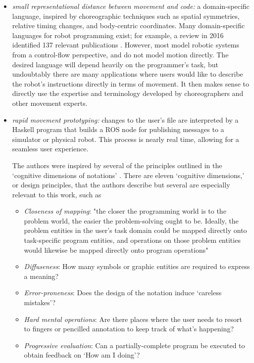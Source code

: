 \documentclass[sigchi-a]{acmart}
\begin{document}
\begin{itemize}
\item \emph{small representational distance between
movement and code:} a domain-specific language, inspired by choreographic
techniques such as spatial symmetries, relative timing changes, and body-centric
coordinates. Many domain-specific languages for robot programming exist; for example, a
review in 2016 identified 137 relevant publications 
\cite{nordmann2016survey}. However, most model robotic
systems from a control-flow perspective, and do not model motion directly. The
desired language will depend heavily on the programmer's task, but undoubtably
there are many applications where users would like to describe the robot's
instructions directly in terms of movement. It then makes sense to directly use
the expertise and terminology developed by choreographers and other movement
experts. 
\item 
\emph{rapid movement prototyping:} changes to the user's file are interpreted by a 
Haskell program that builds a ROS node for publishing messages to a
simulator or physical robot. This process is nearly real time, allowing for a
seamless user experience.

\begin{sidebar}
The authors were inspired by several of the principles
outlined in the `cognitive dimensions of notations' \cite{green1996usability}.
There are eleven `cognitive dimensions,' or design principles, that the authors
describe but several are especially relevant to this work, such as

\begin{itemize}
\item \emph{Closeness of mapping}: "the closer the programming world is to
the problem world, the easier the problem-solving ought to be. Ideally, the
problem entities in the user's task domain could be mapped directly onto
task-specific program entities, and operations on those problem entities would
likewise be mapped directly onto program operations" \cite{green1996usability}
\item \emph{Diffuseness}: How many symbols or graphic entities are required to express a meaning?
\item \emph{Error-proneness}: Does the design of the notation induce `careless mistakes'?
\item \emph{Hard mental operations}: Are there places where the user needs to resort to  fingers or pencilled annotation to keep track of what's happening?
\item \emph{Progressive evaluation}: Can a partially-complete program be executed to
obtain feedback on `How am I doing'?
\end{itemize}


\end{sidebar}
\end{itemize}
\end{document}
